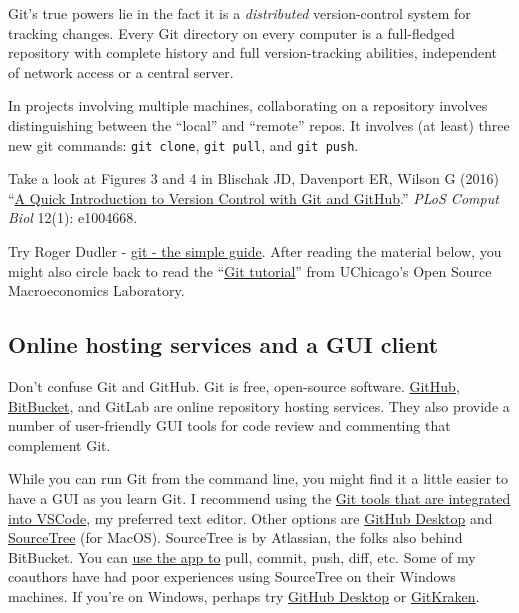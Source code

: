 
Git's true powers lie in the fact it is a \textit{distributed} version-control system for tracking changes.
Every Git directory on every computer is a full-fledged repository with complete history and full version-tracking abilities, independent of network access or a central server.

In projects involving multiple machines,
collaborating on a repository involves distinguishing between the ``local'' and ``remote'' repos.
It involves (at least) three new git commands: \texttt{git clone}, \texttt{git pull}, and \texttt{git push}.

Take a look at Figures 3 and 4 in
Blischak JD, Davenport ER, Wilson G (2016)
``\href{http://journals.plos.org/ploscompbiol/article?id=10.1371/journal.pcbi.1004668}{A Quick Introduction to Version Control with Git and GitHub}.'' \textit{PLoS Comput Biol} 12(1): e1004668.

Try Roger Dudler - \href{http://rogerdudler.github.io/git-guide/}{git - the simple guide}.
After reading the material below, you might also circle back to read
the ``\href{https://github.com/OpenSourceMacro/BootCamp2017/blob/master/Tutorials/git_tutorial.pdf}{Git tutorial}''
from UChicago's Open Source Macroeconomics Laboratory.

\subsection{Online hosting services and a GUI client}

Don't confuse Git and GitHub.
Git is free, open-source software.
\href{http://www.github.com}{GitHub}, \href{https://bitbucket.org/}{BitBucket}, and GitLab are
online repository hosting services.
They also provide a number of user-friendly GUI tools for code review and commenting that complement Git.

While you can run Git from the command line,
you might find it a little easier to have a GUI as you learn Git.
I recommend using the \href{https://code.visualstudio.com/docs/sourcecontrol/overview}{Git tools that are integrated into VSCode}, my preferred text editor.
Other options are 
\href{https://github.com/apps/desktop}{GitHub Desktop} and \href{https://www.sourcetreeapp.com/}{SourceTree} (for MacOS).
SourceTree is by Atlassian, the folks also behind BitBucket.
You can \href{https://confluence.atlassian.com/get-started-with-sourcetree/work-using-git-847359053.html}{use the app to} pull, commit, push, diff, etc.
Some of my coauthors have had poor experiences using SourceTree on their Windows machines.
If you're on Windows, perhaps try \href{https://desktop.github.com/}{GitHub Desktop} or \href{https://www.gitkraken.com/}{GitKraken}.

